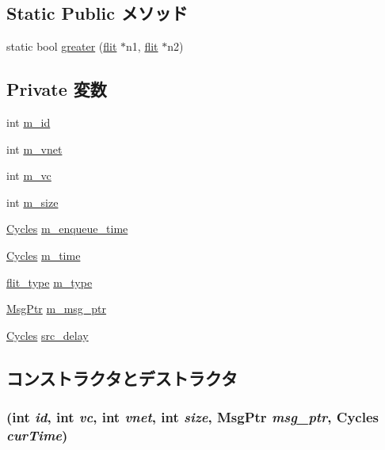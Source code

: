 \subsection*{Static Public メソッド}
\begin{DoxyCompactItemize}
\item 
static bool \hyperlink{classflit_a85b6efbd30a8e431411c75dd14c39d56}{greater} (\hyperlink{classflit}{flit} $\ast$n1, \hyperlink{classflit}{flit} $\ast$n2)
\end{DoxyCompactItemize}
\subsection*{Private 変数}
\begin{DoxyCompactItemize}
\item 
int \hyperlink{classflit_aad966617e7e050bedbead762727808a5}{m\_\-id}
\item 
int \hyperlink{classflit_a1834cf79dfe7f6b9d971ceb81bac5716}{m\_\-vnet}
\item 
int \hyperlink{classflit_aff451e40c19f8624b8556d1524e0b76f}{m\_\-vc}
\item 
int \hyperlink{classflit_a012b2bfbef5380cc57296def37a49a27}{m\_\-size}
\item 
\hyperlink{classCycles}{Cycles} \hyperlink{classflit_a09c7a74d0bb6e5b6d02f0ae0f3fc9264}{m\_\-enqueue\_\-time}
\item 
\hyperlink{classCycles}{Cycles} \hyperlink{classflit_ac39faf9ea84c2e7518ba2f960c661636}{m\_\-time}
\item 
\hyperlink{NetworkHeader_8hh_a2c6c8cfc6307d086e578093535798328}{flit\_\-type} \hyperlink{classflit_aa57009042826e7caec1a969aaad4a591}{m\_\-type}
\item 
\hyperlink{classRefCountingPtr}{MsgPtr} \hyperlink{classflit_afa7739690112aae8964746c5a096d0ae}{m\_\-msg\_\-ptr}
\item 
\hyperlink{classCycles}{Cycles} \hyperlink{classflit_a54c59332d73cfbff1539be34bdd8703b}{src\_\-delay}
\end{DoxyCompactItemize}


\subsection{コンストラクタとデストラクタ}
\hypertarget{classflit_a59080d20c32edd5f6ebd4d95281be501}{
\subsubsection[{flit}]{ (int {\em id}, \/  int {\em vc}, \/  int {\em vnet}, \/  int {\em size}, \/  {\bf MsgPtr} {\em msg\_\-ptr}, \/  {\bf Cycles} {\em curTime})}}
\label{classflit_a59080d20c32edd5f6ebd4d95281be501}



